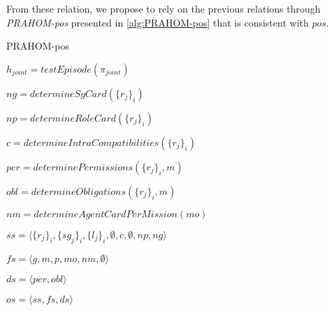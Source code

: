 \documentclass{ecai}
\newcounter{relation}
\begin{document}
From these relation, we propose to rely on the previous relations through \emph{PRAHOM-pos} presented in \autoref{alg:PRAHOM-pos} that is consistent with $pos$.


\begin{algorithm}[hbt!]
    \caption{PRAHOM-pos}\label{alg:PRAHOM-pos}

    $h_{joint} = testEpisode(\pi_{joint})$


    $ng = determineSgCard(\{r_j\}_i)$

    $np = determineRoleCard(\{r_j\}_i)$

    $c = determineIntraCompatibilities(\{r_j\}_i)$

    $per = determinePermissions(\{r_j\}_i, m)$

    $obl = determineObligations(\{r_j\}_i, m)$

    $nm = determineAgentCardPerMission(mo)$

    $ss = \langle \{r_j\}_i, \{sg_j\}_i, \{l_j\}_i, \emptyset, c, \emptyset, np, ng \rangle$

    $fs = \langle {g, m, p, mo, nm}, \emptyset \rangle$

    $ds = \langle per, obl \rangle$

    $os = \langle ss, fs, ds \rangle$

\end{algorithm}
\end{document}
